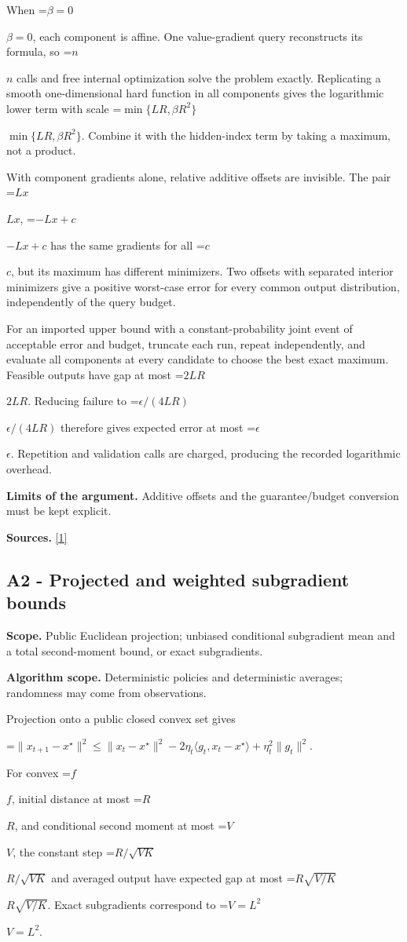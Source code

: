 \documentclass[10pt,a4paper]{article}
\newcommand{\AtlasMath}[1]{\par\begingroup\centering\setbox0=\hbox{$\displaystyle #1$}\ifdim\wd0>1.4\linewidth\typeout{ATLAS WIDE FORMULA: \the\wd0}\fi\ifdim\wd0>\linewidth\resizebox{\linewidth}{!}{\box0}\else\box0\fi\par\endgroup}
\newcommand{\AtlasInlineMath}[1]{\begingroup\setbox0=\hbox{$#1$}\ifdim\wd0>.4\linewidth\endgroup\AtlasMath{#1}\else\endgroup$#1$\fi}
\begin{document}
When \AtlasInlineMath{\beta=0}, each component is affine. One value-gradient query reconstructs its formula, so \AtlasInlineMath{n} calls and free internal optimization solve the problem exactly. Replicating a smooth one-dimensional hard function in all components gives the logarithmic lower term with scale \AtlasInlineMath{\min\{LR,\beta R^2\}}. Combine it with the hidden-index term by taking a maximum, not a product.

With component gradients alone, relative additive offsets are invisible. The pair \AtlasInlineMath{Lx}, \AtlasInlineMath{-Lx+c} has the same gradients for all \AtlasInlineMath{c}, but its maximum has different minimizers. Two offsets with separated interior minimizers give a positive worst-case error for every common output distribution, independently of the query budget.

For an imported upper bound with a constant-probability joint event of acceptable error and budget, truncate each run, repeat independently, and evaluate all components at every candidate to choose the best exact maximum. Feasible outputs have gap at most \AtlasInlineMath{2LR}. Reducing failure to \AtlasInlineMath{\epsilon/(4LR)} therefore gives expected error at most \AtlasInlineMath{\epsilon}. Repetition and validation calls are charged, producing the recorded logarithmic overhead.

\textbf{Limits of the argument.} Additive offsets and the guarantee/budget conversion must be kept explicit.

\textbf{Sources.} \href{https://arxiv.org/pdf/2311.10886}{[1]}

\subsection{A2 - Projected and weighted subgradient bounds}
\textbf{Scope.} Public Euclidean projection; unbiased conditional subgradient mean and a total second-moment bound, or exact subgradients.

\textbf{Algorithm scope.} Deterministic policies and deterministic averages; randomness may come from observations.

Projection onto a public closed convex set gives

\AtlasMath{\|x_{t+1}-x^\star\|^2\le\|x_t-x^\star\|^2
-2\eta_t\langle g_t,x_t-x^\star\rangle+\eta_t^2\|g_t\|^2.}

For convex \AtlasInlineMath{f}, initial distance at most \AtlasInlineMath{R}, and conditional second moment at most \AtlasInlineMath{V}, the constant step \AtlasInlineMath{R/\sqrt{VK}} and averaged output have expected gap at most \AtlasInlineMath{R\sqrt{V/K}}. Exact subgradients correspond to \AtlasInlineMath{V=L^2}.
\end{document}
